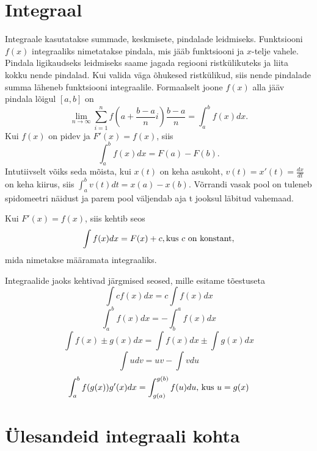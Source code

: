 \documentclass[a4paper,11pt,twocolumn]{article}
\begin{document}
\section{Integraal}
Integraale kasutatakse summade, keskmisete, pindalade leidmiseks. Funktsiooni \( f(x) \) integraaliks nimetatakse pindala, mis jääb funktsiooni ja \( x \)-telje vahele. Pindala ligikaudseks leidmiseks saame jagada regiooni ristkülikuteks ja liita kokku nende pindalad. Kui valida väga õhukesed ristkülikud, siis nende pindalade summa läheneb funktsiooni integraalile. Formaalselt joone \( f(x) \)	alla jääv pindala lõigul \( [a,b] \) on
\[ \lim _ { n \rightarrow \infty } \sum _ { i = 1 } ^ { n } f \left( a+ \frac{b-a}{n}i \right) \frac{b-a}{n} = \int _ { a } ^ { b } f ( x ) dx. \]
Kui \( f(x) \) on pidev ja \( F'(x)=f(x) \), siis
\[ \int _ { a } ^ { b } f ( x ) dx=F(a)-F(b). \]
Intutiivselt võiks seda mõista, kui \( x(t) \) on keha asukoht, \( v(t)=x'(t)=\frac{dx}{dt} \) on keha kiirus, siis \( \int _ { a } ^ { b } v ( t ) dt=x(a)-x(b) \). Võrrandi vasak pool on tuleneb spidomeetri näidust ja parem pool väljendab aja t jooksul läbitud vahemaad.

Kui \( F'(x)=f(x) \), siis kehtib seos \[ \int f(x)dx=F(x)+c, \textrm{kus \( c \) on konstant}, \] mida nimetakse määramata integraaliks.

Integraalide jaoks kehtivad järgmised seosed, mille esitame tõestuseta
\[ \int c f ( x ) d x = c \int f ( x ) d x \]
\[ \int _ { a } ^ { b } f ( x ) d x = - \int _ { b } ^ { a } f ( x ) d x \]
\[ \int f ( x ) \pm g ( x ) d x = \int f ( x ) d x \pm \int g ( x ) d x \]
\[ \int u d v = u v - \int v d u \]
\[ \int _ { a } ^ { b } f ( g ( x ) ) g ^ { \prime } ( x ) d x = \int _ { g ( a ) } ^ { g ( b ) } f ( u ) d u \textrm{, kus \( u=g(x) \)}\]
\section{Ülesandeid integraali kohta}
\end{document}
